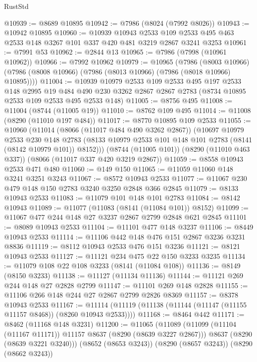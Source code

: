 \begin{lexlean}{RustStd}
\begin{coremodule}
@10939 := @8689 @10895
@10942 := @7986 (@8024 (@7992 @8026))
@10943 := @10942 @10895
@10960 := @10939
    @10943
    @2533
    @109
    @2533
    @495
    @463
    @2533
    @148
    @3267
    @101
    @337
    @420
    @481
    @3219
    @2867
    @3241
    @3253
@10961 := @7991 @53
@10962 := @2844 @13
@10965 := @7986 (@7998 (@10961 @10962))
@10966 := @7992 @10962
@10979 := @10965
    (@7986
      (@8003 @10966)
      (@7986 (@8008 @10966) (@7986 (@8013 @10966) (@7986 (@8018 @10966) @10895))))
@11004 := @10939
    @10979
    @2533
    @109
    @2533
    @495
    @197
    @2533
    @148
    @2995
    @19
    @484
    @490
    @230
    @3262
    @2867
    @2867
    @2783
    (@8734 @10895 @2533 @109 @2533 @495 @2533 @148)
@11005 := @8756 @495
@11008 := @11004 (@8744 (@11005 @19))
@11010 := @8762 @109 @495
@11014 := @11008 (@8290 (@11010 @197 @484))
@11017 := @8770 @10895 @109 @2533
@11055 := @10960
    (@11014
      (@8066 (@11017 @484 @490 @3262 @2867))
      (@10697
        @10979
        @2533
        @230
        @148
        @2783
        (@8133 @10979 @2533 @101 @148 @101 @2783 (@8141 (@8142 @10979 @101)) @8152)))
    (@8744 (@11005 @101))
    (@8290 (@11010 @463 @337))
    (@8066 (@11017 @337 @420 @3219 @2867))
@11059 := @8558 @10943 @2533 @471 @480
@11060 := @149 @150
@11065 := @11059 @11060 @148 @3241 @3251 @3243
@11067 := @8572 @10943 @2533
@11077 := @11067 @230 @479 @148 @150 @2783 @3240 @3250 @2848 @366 @2845
@11079 := @8133 @10943 @2533
@11083 := @11079 @101 @148 @101 @2783
@11084 := @8142 @10943
@11089 := @11077 (@11083 (@8141 (@11084 @101)) @8152)
@11099 := @11067 @477 @244 @148 @27 @3237 @2867 @2799 @2848 @621 @2845
@11101 := @8089 @10943 @2533
@11104 := @11101 @477 @148 @3237
@11106 := @8449 @10943 @2533
@11114 := @11106 @442 @148 @476 @151 @2867 @3236 @3231 @8836
@11119 := @8112 @10943 @2533 @476 @151 @3236
@11121 := @8121 @10943 @2533
@11127 := @11121 @234 @475 @22 @150 @3233 @3235
@11134 := @11079 @108 @22 @108 @3233 (@8141 (@11084 @108))
@11136 := @8149 (@8150 @3233)
@11138 := @11127 (@11134 @11136)
@11144 := @11121 @269 @244 @148 @27 @2828 @2799
@11147 := @11101 @269 @148 @2828
@11155 := @11106 @266 @148 @244 @27 @2867 @2799 @2826 @8369
@11157 := @8378 @10943 @2533
@11167 := @11114 (@11119 (@11138 (@11144 (@11147 (@11155 @11157 @8468)) (@8260 @10943 @2533))))
@11168 := @8464 @442
@11171 := @8462 (@11168 @148 @3231)
@11200 := @11065
    (@11089
      (@11099 (@11104 (@11167 @11171)) @11157 @8637 (@8290 (@8639 @3227 @2867)))
      @8637
      (@8290 (@8639 @3221 @3240)))
    (@8652 (@8653 @3243))
    (@8290 (@8657 @3243))
    (@8290 (@8662 @3243))

\end{coremodule}
\end{lexlean}
